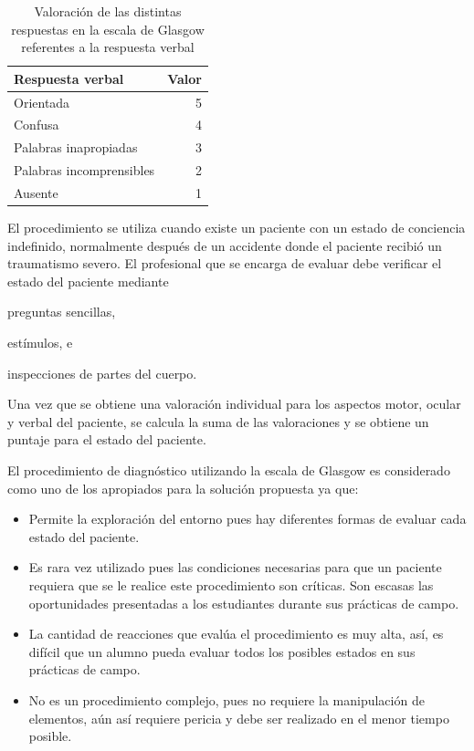 \begin{table}[!hbt]
\centering
\begin{tabular}{lr}
\toprule
\textbf{Respuesta verbal} & \textbf{Valor} \\
\midrule
Orientada & 5 \\
Confusa & 4 \\
Palabras inapropiadas & 3 \\
Palabras incomprensibles & 2 \\
Ausente & 1 \\
\bottomrule
\end{tabular}
\caption{Valoración de las distintas respuestas en la escala de Glasgow
    referentes a la respuesta verbal}
\label{tab:seleccion_glasgow_respuestas_verbal}
\end{table}

El procedimiento se utiliza cuando existe un paciente con un estado de
conciencia indefinido, normalmente después de un accidente donde el paciente
recibió un traumatismo severo. El profesional que se encarga de evaluar debe
verificar el estado del paciente mediante
\begin{enumerate*}[label=\itshape\alph*\upshape.]
\item preguntas sencillas,
\item estímulos, e
\item inspecciones de partes del cuerpo.
\end{enumerate*}
Una vez que se obtiene una valoración individual para los aspectos
motor, ocular y verbal del paciente, se calcula la suma de las valoraciones y se
obtiene un puntaje para el estado del paciente.

El procedimiento de diagnóstico utilizando la escala de Glasgow es considerado
como uno de los apropiados para la solución propuesta ya que:

\begin{itemize}
\item Permite la exploración del entorno pues hay diferentes formas de evaluar cada
    estado del paciente.
\item Es rara vez utilizado pues las condiciones necesarias para que un paciente 
    requiera que se le realice este procedimiento son críticas. Son
    escasas las oportunidades presentadas a los estudiantes durante sus
    prácticas de campo. 
\item La cantidad de reacciones que evalúa el procedimiento es muy alta,
    así, es difícil que un alumno pueda evaluar todos los posibles estados en
    sus prácticas de campo.
\item No es un procedimiento complejo, pues no requiere la manipulación de
    elementos, aún así requiere pericia y debe ser realizado en el menor tiempo
    posible.
\end{itemize}


